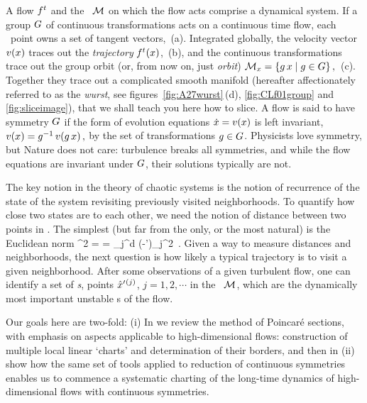 A flow $f^t$ and the \statesp\ ${\cal M}$ on which the flow acts comprise a
{dynamical system}. If a group $G$ of continuous transformations
acts on a continuous time flow, each \statesp\ point owns a set of
tangent vectors, \,(a). Integrated globally, the
velocity vector $v(x)$ traces out the {\em trajectory}
${f^{t}(x)}$, \,(b), and the continuous
transformations trace out the {group orbit} (or, from now on, just
\emph{orbit})
\(
{\cal M}_{x} = \{g\,x \mid g \in {\ensuremath{G}}\}
\,,
\) %
\,(c). Together they trace out a complicated smooth
manifold (hereafter affectionately referred to as the {\em wurst}, see
figures~\ref{fig:A27wurst}\,(d), \ref{fig:CLf01group} and \ref{fig:sliceimage}), that we shall
teach you here how to slice.
A flow is said to have symmetry $G$ if the form of evolution
equations $\dot{x} = v(x)$ is left invariant,
\(
v(x)=g^{-1} \, v(g \, x)
\,,
\) %
by the set of transformations $g \in {\ensuremath{G}}$. Physicists love
symmetry, but Nature does not care: turbulence breaks all symmetries,
and while the flow equations are invariant under $G$, their
solutions typically are not.

The key notion in the theory of chaotic systems is the notion of
recurrence of the state of the system revisiting previously visited
neighborhoods. To quantify how close two states are to
each other, we need the notion of distance between two points in
\statesp. The simplest (but far from the only, or the most natural) is
the Euclidean norm
\beq
  ^2  =  =
\sum_j^d
(\ssp-\ssp')_j^2
\,.
Given a way to measure distances and neighborhoods, the next question is
how likely a typical trajectory is to visit a given neighborhood.
After some observations of a given turbulent flow, one can identify a set
of \emph{\template s}, {points}
${\hat{x}'}{}^{(j)}$, $j=1,2,\cdots$ in the \statesp\ ${\cal M}$, which are the
dynamically most important unstable {\recurrStr s} of the flow.

Our goals here are two-fold:
(i) In  we review the method of Poincar\'e sections, with
    emphasis on aspects applicable to high-dimensional flows: construction of
    multiple local linear `charts' and determination of their borders, and then in
(ii)  show how the same set of tools applied to
    reduction of continuous symmetries enables us to commence a
    systematic charting of the long-time dynamics of high-dimensional
    flows with continuous symmetries.

